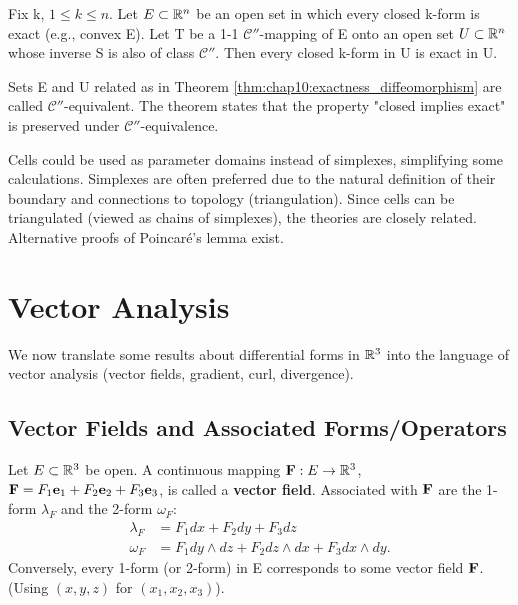 \begin{theorem}
  \label{thm:chap10:exactness_diffeomorphism}
  Fix k, $1 \le k \le n$. Let $E \subset \mathbb{R}^n$ be an open set in
  which every closed k-form is exact (e.g., convex E). Let T be a 1-1
  $\mathcal{C}''$-mapping of E onto an open set $U \subset \mathbb{R}^n$
  whose inverse S is also of class $\mathcal{C}''$.
  Then every closed k-form in U is exact in U.
\end{theorem}

\begin{remark}
  Sets E and U related as in Theorem
  \ref{thm:chap10:exactness_diffeomorphism} are called
  $\mathcal{C}''$-equivalent. The theorem states that the property
  "closed implies exact" is preserved under $\mathcal{C}''$-equivalence.
\end{remark}

\begin{remark}
  \label{rem:chap10:cells_vs_simplexes}
  Cells could be used as parameter domains instead of simplexes,
  simplifying some calculations. Simplexes are often preferred due to
  the natural definition of their boundary and connections to
  topology (triangulation). Since cells can be triangulated (viewed
  as chains of simplexes), the theories are closely related.
  Alternative proofs of Poincaré's lemma exist.
\end{remark}

\section{Vector Analysis}

We now translate some results about differential forms in $\mathbb{R}^3$ into
the language of vector analysis (vector fields, gradient, curl, divergence).

\subsection*{Vector Fields and Associated Forms/Operators}
\label{sec:chap10:vector_fields}

Let $E \subset \mathbb{R}^3$ be open. A continuous mapping
$\mathbf{F}: E \to \mathbb{R}^3$, $\mathbf{F} = F_1 \mathbf{e}_1 + F_2
\mathbf{e}_2 + F_3 \mathbf{e}_3$, is called a \textbf{vector field}.
Associated with $\mathbf{F}$ are the 1-form $\lambda_F$ and the 2-form $\omega_F$:
\begin{align*}
  \lambda_F &= F_1 dx + F_2 dy + F_3 dz \\
  \omega_F &= F_1 dy \wedge dz + F_2 dz \wedge dx + F_3 dx \wedge dy.
\end{align*}
Conversely, every 1-form (or 2-form) in E corresponds to some vector
field $\mathbf{F}$. (Using $(x, y, z)$ for $(x_1, x_2, x_3)$).

